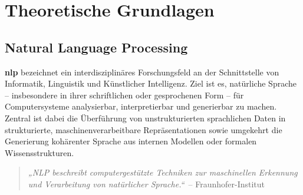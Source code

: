 \chapter{Theoretische Grundlagen}

\section{Natural Language Processing}




\textbf{\ac{nlp}} bezeichnet ein interdisziplinäres Forschungsfeld an der Schnittstelle von Informatik, Linguistik und Künstlicher Intelligenz. Ziel ist es, natürliche Sprache – insbesondere in ihrer schriftlichen oder gesprochenen Form – für Computersysteme analysierbar, interpretierbar und generierbar zu machen. Zentral ist dabei die Überführung von unstrukturierten sprachlichen Daten in strukturierte, maschinenverarbeitbare Repräsentationen sowie umgekehrt die Generierung kohärenter Sprache aus internen Modellen oder formalen Wissensstrukturen.

\begin{quote}
    \textit{„NLP beschreibt computergestützte Techniken zur maschinellen Erkennung und Verarbeitung von natürlicher Sprache.“}\
    – Fraunhofer-Institut
\end{quote}


